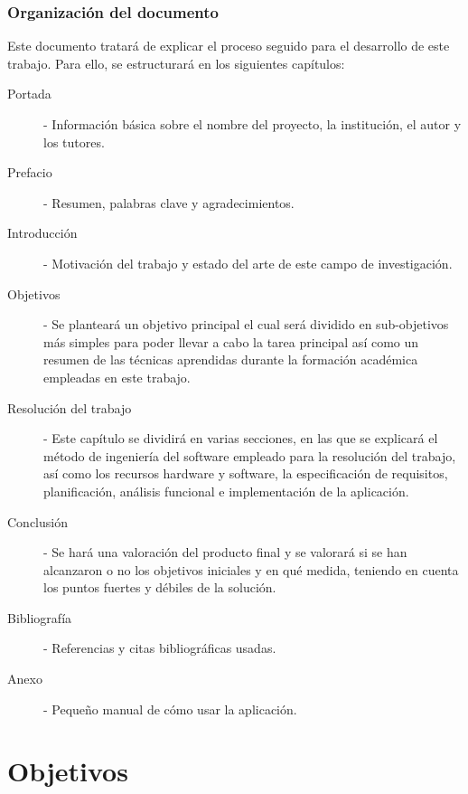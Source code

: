 \documentclass[a4paper,11pt]{book}
\begin{document}
\subsection{Organización del documento}
Este documento tratará de explicar el proceso seguido para el desarrollo de este trabajo. Para ello, se estructurará en los siguientes capítulos:\\
\begin{description}
	\item [Portada] - Información básica sobre el nombre del proyecto, la institución, el autor y los tutores.
	\item [Prefacio] - Resumen, palabras clave y agradecimientos.
	\item [Introducción] - Motivación del trabajo y estado del arte de este campo de investigación.  
	\item [Objetivos] - Se planteará un objetivo principal el cual será dividido en sub-objetivos más simples para poder llevar a cabo la tarea principal así como un resumen de las técnicas aprendidas durante la formación académica empleadas en este trabajo.
	\item [Resolución del trabajo] - Este capítulo se dividirá en varias secciones, en las que se explicará el método de ingeniería del software empleado para la resolución del trabajo, así como los recursos hardware y software, la especificación de requisitos, planificación, análisis funcional e implementación de la aplicación.
	\item [Conclusión] - Se hará una valoración del producto final y se valorará si se han alcanzaron o no los objetivos iniciales y en qué medida, teniendo en cuenta los puntos fuertes y débiles de la solución.
	\item [Bibliografía] - Referencias y citas bibliográficas usadas.
	\item [Anexo] - Pequeño manual de cómo usar la aplicación.
\end{description} 

\chapter{Objetivos}
\end{document}
